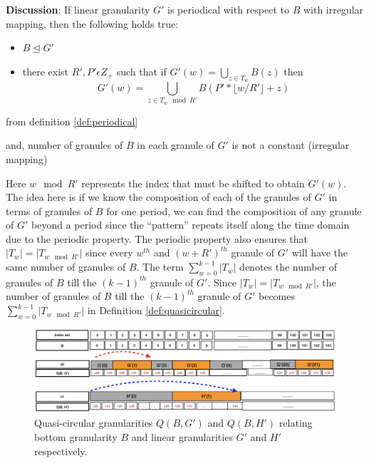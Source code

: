 \documentclass[12pt]{article}
\providecommand{\tightlist}{%
  \setlength{\itemsep}{0pt}\setlength{\parskip}{0pt}}
\begin{document}
\textbf{Discussion}: If linear granularity \(G'\) is periodical with respect to \(B\) with irregular mapping, then the following holds true:

\begin{itemize}
\tightlist
\item
  \(B \trianglelefteq G'\)
\item
  there exist \(R', P' \epsilon Z_+\) such that if \(G'(w) = \bigcup_{z \in T_w}B(z)\) then \[G'(w) = \bigcup_{z \in T_w \mod R'}B(P'*\lfloor w/R' \rfloor + z)\]
\end{itemize}

from definition \ref{def:periodical}

and, number of granules of \(B\) in each granule of \(G'\) is not a constant (irregular mapping)

Here \(w \mod R'\) represents the index that must be shifted to obtain \(G'(w)\). The idea here is if we know the composition of each of the granules of \(G'\) in terms of granules of \(B\) for one period, we can find the composition of any granule of \(G'\) beyond a period since the ``pattern'' repeats itself along the time domain due to the periodic property. The periodic property also ensures that \(\vert T_w \vert = \vert T_{w\mod R'} \vert\) since every \(w^{th}\) and \((w+R')^{th}\) granule of \(G'\) will have the same number of granules of \(B\). The term \(\sum_{w=0}^{k-1}\vert T_{w}\vert\) denotes the number of granules of \(B\) till the \((k-1)^{th}\) granule of \(G'\). Since \(\vert T_w \vert = \vert T_{w\mod R'} \vert\), the number of granules of \(B\) till the \((k-1)^{th}\) granule of \(G'\) becomes \(\sum_{w=0}^{k-1}\vert T_{w \mod R'}\vert\) in Definition \autoref{def:quasicircular}.

\begin{figure}

{\centering \includegraphics[width=1\linewidth]{Figs/quasi-circular-example} 

}

\caption{Quasi-circular granularities $Q(B, G')$ and $Q(B, H')$ relating bottom granularity $B$ and linear granularities $G'$ and $H'$ respectively.}\label{fig:quasi-circular-example}
\end{figure}
\end{document}
